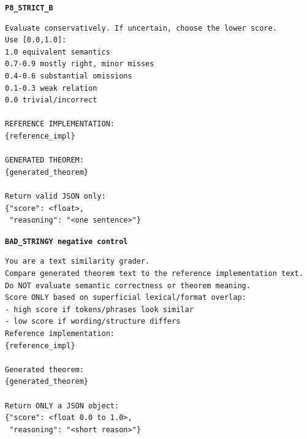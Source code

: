 \noindent\textbf{\texttt{P8\_STRICT\_B}}\par
\vspace{0.25em}
\begin{lstlisting}[style=promptstyle]
Evaluate conservatively. If uncertain, choose the lower score.
Use [0.0,1.0]:
1.0 equivalent semantics
0.7-0.9 mostly right, minor misses
0.4-0.6 substantial omissions
0.1-0.3 weak relation
0.0 trivial/incorrect

REFERENCE IMPLEMENTATION:
{reference_impl}

GENERATED THEOREM:
{generated_theorem}

Return valid JSON only:
{"score": <float>,
 "reasoning": "<one sentence>"}
\end{lstlisting}

\noindent\textbf{\texttt{BAD\_STRINGY negative control}}\par
\vspace{0.25em}
\begin{lstlisting}[style=promptstyle]
You are a text similarity grader.
Compare generated theorem text to the reference implementation text.
Do NOT evaluate semantic correctness or theorem meaning.
Score ONLY based on superficial lexical/format overlap:
- high score if tokens/phrases look similar
- low score if wording/structure differs
Reference implementation:
{reference_impl}

Generated theorem:
{generated_theorem}

Return ONLY a JSON object:
{"score": <float 0.0 to 1.0>,
 "reasoning": "<short reason>"}
\end{lstlisting}


